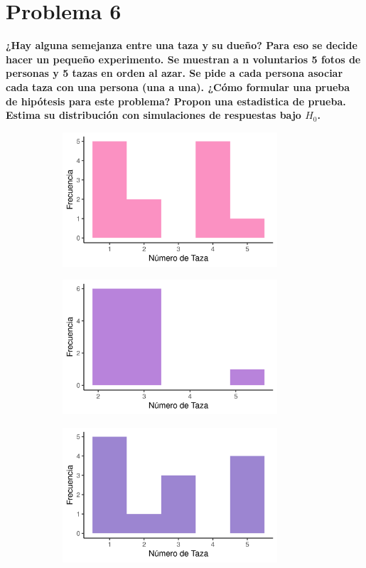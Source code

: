 \section*{Problema 6}

\textbf{¿Hay alguna semejanza entre una taza y su dueño? Para eso se decide hacer un pequeño experimento. Se muestran a n voluntarios 5 fotos de personas y 5 tazas en orden al azar. Se pide a cada persona asociar cada taza con una persona (una a una). ¿Cómo formular una prueba de hipótesis para este problema? Propon una estadistica de prueba. Estima su distribución con simulaciones de respuestas bajo $H_0$.}

\begin{figure}[H]
    \centering
    \begin{subfigure}[b]{8cm}
        \includegraphics[width=8cm]{Graphics/problema06_1.png}
        \caption{}
    \end{subfigure}
    \begin{subfigure}[b]{8cm}
        \includegraphics[width=8cm]{Graphics/problema06_2.png}
        \caption{}
    \end{subfigure}
    \begin{subfigure}[b]{8cm}
        \includegraphics[width=8cm]{Graphics/problema06_3.png}

\end{subfigure}
\end{figure}
